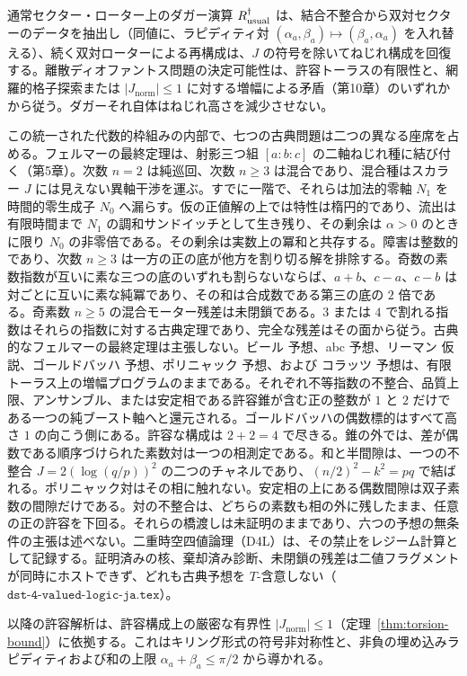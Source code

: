 \documentclass[a4paper]{article}
\theoremstyle{definition}
\theoremstyle{remark}
\newcommand{\Jnorm}{J_{\mathrm{norm}}}
\begin{document}
通常セクター・ローター上のダガー演算 \(R_{\rm usual}^\dagger\) は、結合不整合から双対セクターのデータを抽出し（同値に、ラピディティ対 \((\alpha_a,\beta_a)\mapsto(\beta_a,\alpha_a)\) を入れ替える）、続く双対ローターによる再構成は、\(J\) の符号を除いてねじれ構成を回復する。離散ディオファントス問題の決定可能性は、許容トーラスの有限性と、網羅的格子探索または \(|\Jnorm|\le 1\) に対する増幅による矛盾（第10章）のいずれかから従う。ダガーそれ自体はねじれ高さを減少させない。

この統一された代数的枠組みの内部で、七つの古典問題は二つの異なる座席を占める。フェルマーの最終定理は、射影三つ組 \([a:b:c]\) の二軸ねじれ種に結び付く（第5章）。次数 \(n=2\) は純巡回、次数 \(n\ge 3\) は混合であり、混合種はスカラー \(J\) には見えない異軸干渉を運ぶ。すでに一階で、それらは加法的零軸 \(N_1\) を時間的零生成子 \(N_0\) へ漏らす。仮の正値解の上では特性は楕円的であり、流出は有限時間まで \(N_1\) の調和サンドイッチとして生き残り、その剰余は \(\alpha>0\) のときに限り \(N_0\) の非零倍である。その剰余は実数上の冪和と共存する。障害は整数的であり、次数 \(n\ge 3\) は一方の正の底が他方を割り切る解を排除する。奇数の素数指数が互いに素な三つの底のいずれも割らないならば、\(a+b\)、\(c-a\)、\(c-b\) は対ごとに互いに素な純冪であり、その和は合成数である第三の底の \(2\) 倍である。奇素数 \(n\ge 5\) の混合モーター残差は未閉鎖である。\(3\) または \(4\) で割れる指数はそれらの指数に対する古典定理であり、完全な残差はその面から従う。古典的なフェルマーの最終定理は主張しない。ビール 予想、abc 予想、リーマン 仮説、ゴールドバッハ 予想、ポリニャック 予想、および コラッツ 予想は、有限トーラス上の増幅プログラムのままである。それぞれ不等指数の不整合、品質上限、アンサンブル、または安定相である許容錐が含む正の整数が \(1\) と \(2\) だけである一つの純ブースト軸へと還元される。ゴールドバッハの偶数標的はすべて高さ \(1\) の向こう側にある。許容な構成は \(2+2=4\) で尽きる。錐の外では、差が偶数である順序づけられた素数対は一つの相測定である。和と半間隙は、一つの不整合 \(J=2(\log(q/p))^2\) の二つのチャネルであり、\((n/2)^2-k^2=pq\) で結ばれる。ポリニャック対はその相に触れない。安定相の上にある偶数間隙は双子素数の間隙だけである。対の不整合は、どちらの素数も相の外に残したまま、任意の正の許容を下回る。それらの橋渡しは未証明のままであり、六つの予想の無条件の主張は述べない。二重時空四値論理（D4L）は、その禁止をレジーム計算として記録する。証明済みの核、棄却済み診断、未閉鎖の残差は二値フラグメントが同時にホストできず、どれも古典予想を \(T\)-含意しない（\(\texttt{dst-4-valued-logic-ja.tex}\)）。

以降の許容解析は、許容構成上の厳密な有界性 \(|\Jnorm| \leq 1\)（定理~\ref{thm:torsion-bound}）に依拠する。これはキリング形式の符号非対称性と、非負の埋め込みラピディティおよび和の上限 \(\alpha_a + \beta_a \leq \pi/2\) から導かれる。
\end{document}
